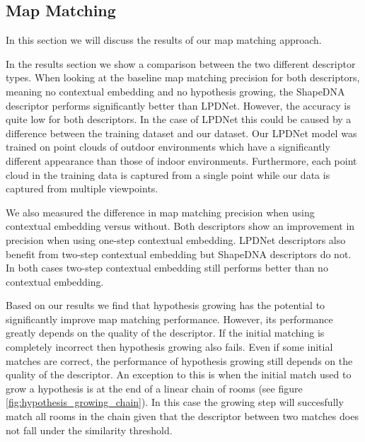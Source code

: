 \pagebreak



\subsection{Map Matching}
In this section we will discuss the results of our map matching approach. 

In the results section we show a comparison between the two different descriptor types. When looking at the baseline map matching precision for both descriptors, meaning no contextual embedding and no hypothesis growing, the ShapeDNA descriptor performs significantly better than LPDNet. However, the accuracy is quite low for both descriptors. In the case of LPDNet this could be caused by a difference between the training dataset and our dataset. Our LPDNet model was trained on point clouds of outdoor environments which have a significantly different appearance than those of indoor environments. Furthermore, each point cloud in the training data is captured from a single point while our data is captured from multiple viewpoints.

We also measured the difference in map matching precision when using contextual embedding versus without. Both descriptors show an improvement in precision when using one-step contextual embedding. LPDNet descriptors also benefit from two-step contextual embedding but ShapeDNA descriptors do not. In both cases two-step contextual embedding still performs better than no contextual embedding.

Based on our results we find that hypothesis growing has the potential to significantly improve map matching performance. However, its performance greatly depends on the quality of the descriptor. If the initial matching is completely incorrect then hypothesis growing also fails. Even if some initial matches are correct, the performance of hypothesis growing still depends on the quality of the descriptor. An exception to this is when the initial match used to grow a hypothesis is at the end of a linear chain of rooms (see figure \ref{fig:hypothesis_growing_chain}). In this case the growing step will succesfully match all rooms in the chain given that the descriptor between two matches does not fall under the similarity threshold. 


